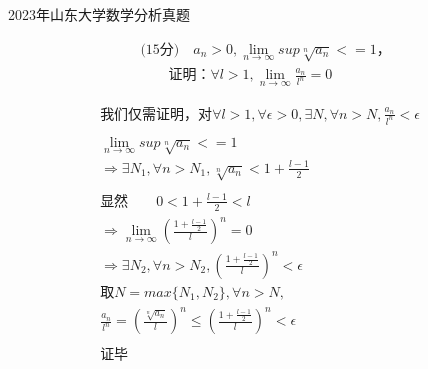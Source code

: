 \documentclass{ctexart}
\begin{document}
\fontsize{25.0pt}{\baselineskip}\selectfont

\begin{center}
    \color{ForestGreen} 2023年山东大学数学分析真题
\end{center}

\fontsize{25.0pt}{\baselineskip}\selectfont
\begin{align*}
&\mbox{(15分)}\quad a_n>0, \lim_{n\to\infty}sup{\sqrt[n]{a_n}} <= 1， \\
&\quad\quad\mbox{证明：}\forall l>1, \lim_{n\to\infty}\frac{a_n}{l^n} = 0
\end{align*}

\newpage
{}
\fontsize{20.0pt}{\baselineskip}\selectfont

\begin{align*}
&\mbox{我们仅需证明，对}\forall l > 1, \forall \epsilon>0, \exists N, \forall n > N , \frac{a_n}{l^n} < \epsilon &\\
\\
&\lim_{n\to\infty}sup{\sqrt[n]{a_n}} <= 1 &\\
&\Longrightarrow \exists N_1, \forall n>N_1, \sqrt[n]{a_n} < 1+\frac{l-1}{2}\\
\\
&\mbox{显然} \quad\quad 0<1+\frac{l-1}{2}<l &\\
&\Longrightarrow \lim_{n\to\infty} (\frac{1+\frac{l-1}{2}}{l})^n = 0&\\
&\Longrightarrow \exists N_2, \forall n>N_2, (\frac{1+\frac{l-1}{2}}{l})^n < \epsilon &\\
&\mbox{取} N = max\{N_1, N_2\}, \forall n>N, &\\
&\frac{a_n}{l^n} = (\frac{\sqrt[n]{a_n}}{l})^n \le (\frac{1+\frac{l-1}{2}}{l})^n < \epsilon &\\
\\
&\mbox{证毕}&
\end{align*}
\end{document}
